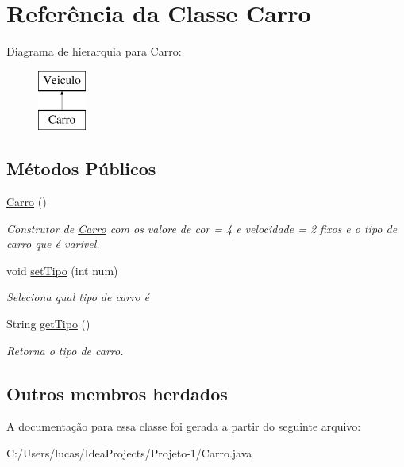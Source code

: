 \hypertarget{class_carro}{}\section{Referência da Classe Carro}
\label{class_carro}
Diagrama de hierarquia para Carro\+:\begin{figure}[H]
\begin{center}
\leavevmode
\includegraphics[height=2.000000cm]{class_carro}
\end{center}
\end{figure}
\subsection*{Métodos Públicos}
\begin{DoxyCompactItemize}
\item 
\mbox{\label{class_carro_a853f79365b5c36491d34cf8f3815f75e}} 
\mbox{\hyperlink{class_carro_a853f79365b5c36491d34cf8f3815f75e}{Carro}} ()
\begin{DoxyCompactList}\small\item\em Construtor de \mbox{\hyperlink{class_carro}{Carro}} com os valore de cor = 4 e velocidade = 2 fixos e o tipo de carro que é varivel. \end{DoxyCompactList}\item 
\mbox{\label{class_carro_aa2e79f3882d45b9558975402c204575f}} 
void \mbox{\hyperlink{class_carro_aa2e79f3882d45b9558975402c204575f}{set\+Tipo}} (int num)
\begin{DoxyCompactList}\small\item\em Seleciona qual tipo de carro é \end{DoxyCompactList}\item 
\mbox{\label{class_carro_a44c3fde04be3cc309b9eac8b826c1560}} 
String \mbox{\hyperlink{class_carro_a44c3fde04be3cc309b9eac8b826c1560}{get\+Tipo}} ()
\begin{DoxyCompactList}\small\item\em Retorna o tipo de carro. \end{DoxyCompactList}\end{DoxyCompactItemize}
\subsection*{Outros membros herdados}


A documentação para essa classe foi gerada a partir do seguinte arquivo\+:\begin{DoxyCompactItemize}
\item 
C\+:/\+Users/lucas/\+Idea\+Projects/\+Projeto-\/1/Carro.\+java\end{DoxyCompactItemize}
